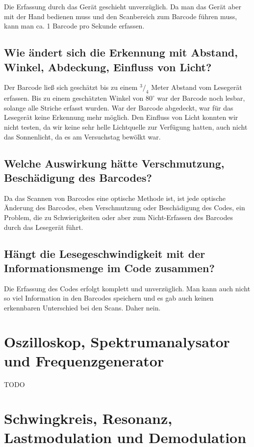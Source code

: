 \documentclass[a4paper,11pt,headsepline,footsepline,parskip=half]{scrartcl}
\begin{document}
Die Erfassung durch das Gerät geschieht unverzüglich. Da man das Gerät aber mit der Hand bedienen muss und den
Scanbereich zum Barcode führen muss, kann man ca. 1 Barcode pro Sekunde erfassen.

\subsection{Wie ändert sich die Erkennung mit Abstand, Winkel, Abdeckung, Einfluss von Licht?}

Der Barcode ließ sich geschätzt bis zu einem $^3/_4$ Meter Abstand vom Lesegerät erfassen. Bis zu einem geschätzten
Winkel von $80^\circ$ war der Barcode noch lesbar, solange alle Striche erfasst wurden. War der Barcode abgedeckt, war
für das Lesegerät keine Erkennung mehr möglich. Den Einfluss von Licht konnten wir nicht testen, da wir keine
sehr helle Lichtquelle zur Verfügung hatten, auch nicht das Sonnenlicht, da es am Versuchstag bewölkt war.

\subsection{Welche Auswirkung hätte Verschmutzung, Beschädigung des Barcodes?}

Da das Scannen von Barcodes eine optische Methode ist, ist jede optische Änderung des Barcodes, eben Verschmutzung oder Beschädigung des
Codes, ein Problem, die zu Schwierigkeiten oder aber zum Nicht-Erfassen des Barcodes durch das Lesegerät führt.

\subsection{Hängt die Lesegeschwindigkeit mit der Informationsmenge im Code zusammen?}

Die Erfassung des Codes erfolgt komplett und unverzüglich. Man kann auch nicht so viel Information in den Barcodes
speichern und es gab auch keinen erkennbaren Unterschied bei den Scans. Daher nein.

\section{Oszilloskop, Spektrumanalysator und Frequenzgenerator}

TODO

\section{Schwingkreis, Resonanz, Lastmodulation und Demodulation}
\end{document}
